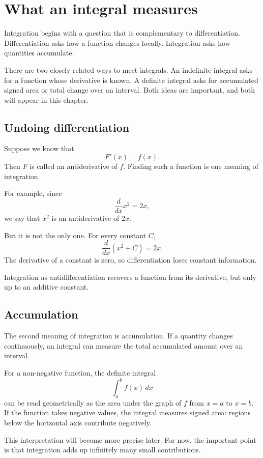 \section{What an integral measures}

Integration begins with a question that is complementary to differentiation. Differentiation asks how a function changes locally. Integration asks how quantities accumulate.

There are two closely related ways to meet integrals. An indefinite integral asks for a function whose derivative is known. A definite integral asks for accumulated signed area or total change over an interval. Both ideas are important, and both will appear in this chapter.

\subsection*{Undoing differentiation}

Suppose we know that
\[
F'(x)=f(x).
\]
Then \(F\) is called an antiderivative of \(f\). Finding such a function is one meaning of integration.

For example, since
\[
\frac{d}{dx}x^2=2x,
\]
we say that \(x^2\) is an antiderivative of \(2x\).

But it is not the only one. For every constant \(C\),
\[
\frac{d}{dx}(x^2+C)=2x.
\]
The derivative of a constant is zero, so differentiation loses constant information.

\begin{remarkbox}
Integration as antidifferentiation recovers a function from its derivative, but only up to an additive constant.
\end{remarkbox}

\subsection*{Accumulation}

The second meaning of integration is accumulation. If a quantity changes continuously, an integral can measure the total accumulated amount over an interval.

For a non-negative function, the definite integral
\[
\int_a^b f(x)\,dx
\]
can be read geometrically as the area under the graph of \(f\) from \(x=a\) to \(x=b\). If the function takes negative values, the integral measures signed area: regions below the horizontal axis contribute negatively.

This interpretation will become more precise later. For now, the important point is that integration adds up infinitely many small contributions.

